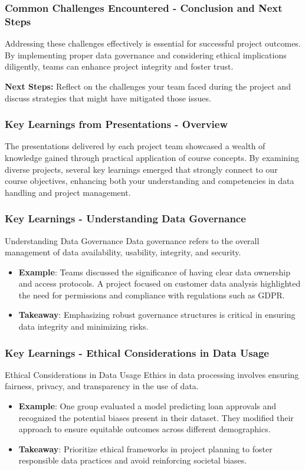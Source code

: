 \documentclass{beamer}
\begin{document}
\begin{frame}[fragile]
    \frametitle{Common Challenges Encountered - Conclusion and Next Steps}
    Addressing these challenges effectively is essential for successful project outcomes. 
    By implementing proper data governance and considering ethical implications diligently, teams can enhance project integrity and foster trust.

    \textbf{Next Steps:} 
    Reflect on the challenges your team faced during the project and discuss strategies that might have mitigated those issues.
\end{frame}

\begin{frame}
    \frametitle{Key Learnings from Presentations - Overview}
    The presentations delivered by each project team showcased a wealth of knowledge gained through practical application of course concepts. By examining diverse projects, several key learnings emerged that strongly connect to our course objectives, enhancing both your understanding and competencies in data handling and project management.
\end{frame}

\begin{frame}
    \frametitle{Key Learnings - Understanding Data Governance}
    \begin{block}{Understanding Data Governance}
        Data governance refers to the overall management of data availability, usability, integrity, and security. 
    \end{block}
    \begin{itemize}
        \item \textbf{Example}: Teams discussed the significance of having clear data ownership and access protocols. A project focused on customer data analysis highlighted the need for permissions and compliance with regulations such as GDPR.
        \item \textbf{Takeaway}: Emphasizing robust governance structures is critical in ensuring data integrity and minimizing risks.
    \end{itemize}
\end{frame}

\begin{frame}
    \frametitle{Key Learnings - Ethical Considerations in Data Usage}
    \begin{block}{Ethical Considerations in Data Usage}
        Ethics in data processing involves ensuring fairness, privacy, and transparency in the use of data.
    \end{block}
    \begin{itemize}
        \item \textbf{Example}: One group evaluated a model predicting loan approvals and recognized the potential biases present in their dataset. They modified their approach to ensure equitable outcomes across different demographics.
        \item \textbf{Takeaway}: Prioritize ethical frameworks in project planning to foster responsible data practices and avoid reinforcing societal biases.
    \end{itemize}
\end{frame}
\end{document}
